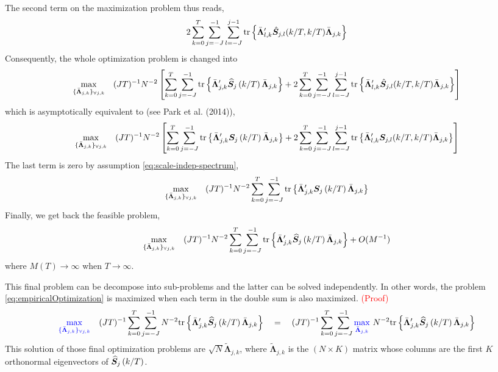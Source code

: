\documentclass[main_document.tex]{subfiles}
\begin{document}
The second term on the maximization problem thus reads, 
\begin{align*}
	2 \locsum{k} \scalesum{j} \sum_{l=-J}^{j-1} \mathrm{tr} \left \{\optLoadings{l}{k}' \Hat{\bm{S}}_{j,l}(k/T, k/T) \optLoadings{j}{k} \right \}
\end{align*}
Consequently, the whole optimization problem is changed into
\begin{align*}
	\max_{\setOptLoadings} \quad (JT)^{-1}N^{-2} \left[ \locsum{k} \scalesum{j} \mathrm{tr} \left \{\optLoadings{j}{k}' \estimCEWS{j}{k} \optLoadings{j}{k} \right \} + 2 \locsum{k} \scalesum{j} \sum_{l=-J}^{j-1} \mathrm{tr} \left \{\optLoadings{l}{k}' \Hat{\bm{S}}_{j,l}(k/T, k/T) \optLoadings{j}{k} \right \} \right]
\end{align*}
which is asymptotically equivalent to (see Park et al. (2014)),
\begin{align*}
	\max_{\setOptLoadings} \quad (JT)^{-1}N^{-2} \left[ \locsum{k} \scalesum{j} \mathrm{tr} \left \{\optLoadings{j}{k}' \CEWS{j}{k} \optLoadings{j}{k} \right \} + 2 \locsum{k} \scalesum{j} \sum_{l=-J}^{j-1} \mathrm{tr} \left \{\optLoadings{l}{k}' \bm{S}_{j,l}(k/T, k/T) \optLoadings{j}{k} \right \} \right]
\end{align*}
The last term is zero by assumption \eqref{eq:scale-indep-spectrum}, 
\begin{align*}
	\max_{\setOptLoadings} \quad (JT)^{-1}N^{-2} \locsum{k} \scalesum{j} \mathrm{tr} \left \{\optLoadings{j}{k}' \CEWS{j}{k} \optLoadings{j}{k} \right \}
\end{align*}
Finally, we get back the feasible problem, 
\begin{align}\label{eq:empiricalOptimization}
	\max_{\setOptLoadings} \quad (JT)^{-1}N^{-2} \locsum{k} \scalesum{j} \mathrm{tr} \left \{\optLoadings{j}{k}' \estimCEWS{j}{k} \optLoadings{j}{k} \right \} + O(M^{-1})
\end{align}
where $M(T) \to \infty$ when $T \to \infty$.

This final problem can be decompose into sub-problems and the latter can be solved independently. In other words, the problem \eqref{eq:empiricalOptimization} is maximized when each term in the double sum is also maximized. \textcolor{red}{(Proof)}
\begin{align*}
	\textcolor{blue}{\max_{\setOptLoadings}} \quad (JT)^{-1} \locsum{k} \scalesum{j} N^{-2} \mathrm{tr} \left \{\optLoadings{j}{k}' \estimCEWS{j}{k} \optLoadings{j}{k} \right \} \quad = \quad (JT)^{-1} \locsum{k} \scalesum{j} \textcolor{blue}{\max_{\optLoadings{j}{k}}} \text{ } N^{-2} \mathrm{tr} \left \{\optLoadings{j}{k}' \estimCEWS{j}{k} \optLoadings{j}{k} \right \}
\end{align*}
This solution of those final optimization problems are $\sqrt{N}\bm{\tilde{\Lambda}}_{j,k}$, where $\bm{\tilde{\Lambda}}_{j,k}$ is the $(N \times K)$ matrix whose columns are the first $K$ orthonormal eigenvectors of $\widehat{\bm{S}}_{j}\left(k/T\right)$.\\
\end{document}
